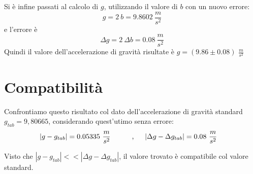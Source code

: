 \documentclass[12pt, a4paper]{article}
\begin{document}
Si è infine passati al calcolo di $g$, utilizzando il valore di $b$ con un nuovo errore:
\begin{equation*}
    g=2 \ b=9.8602\ \frac{m}{s^2}
\end{equation*}
e l'errore è
\begin{equation*}
    \Delta g=2\ \Delta b=0.08\ \frac{m}{s^2}
\end{equation*}
Quindi il valore dell'accelerazione di gravità risultate è $g=(9.86\pm0.08)$ $\frac{m}{s^2}$
\section{Compatibilità}
Confrontiamo questo risultato col dato dell'accelerazione di gravità standard $g_{tab}=9,80665$, considerando quest'utimo senza errore:
\begin{equation*}
\begin{aligned}
  & |g-g_{tab}|=0.05335 \ \frac{m}{s^2}
  &\quad{} 
  \end{aligned}
  \begin{aligned}
  &&\text{,\phantom{..}}& & 
  |\Delta g-\Delta g_{tab}|=0.08\ \frac{m}{s^2}
  &
  \end{aligned}
\end{equation*}

Visto che $|g-g_{tab}|<< |\Delta g-\Delta g_{tab}|$, il valore trovato è compatibile col valore standard.



\newpage
\end{document}
